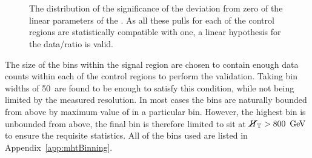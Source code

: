 \begin{figure}[h!]
  \centering
  ~~
  \\
  ~~
  \\
  \caption{
  The distribution of the significance of the deviation from zero of
  the linear parameters of the . As all these pulls for each of the
  control regions are statistically compatible with one, a linear
  hypothesis for the \MHT data/\MC ratio is valid.}
  \label{fig:pulls} 
\end{figure}

The size of the \MHT bins within the signal region are chosen to
contain enough data counts within each of the control regions to
perform the validation. Taking \MHT bin widths of 50~\gev are found
to be enough to satisfy this condition, while not being limited by the
measured \MHT resolution. In most cases the \MHT bins
are naturally bounded from above by maximum value of \HT in a
particular bin.  However, the highest \HT bin is unbounded from above,
the final \MHT bin is therefore limited to sit at $\mbox{$\cancel{H}_\text{T}$}>800~\mathrm{\,Ge\kern -0.1em V}$ to
ensure the requisite statistics. All of the bins used are listed in
Appendix~\ref{app:mhtBinning}.


